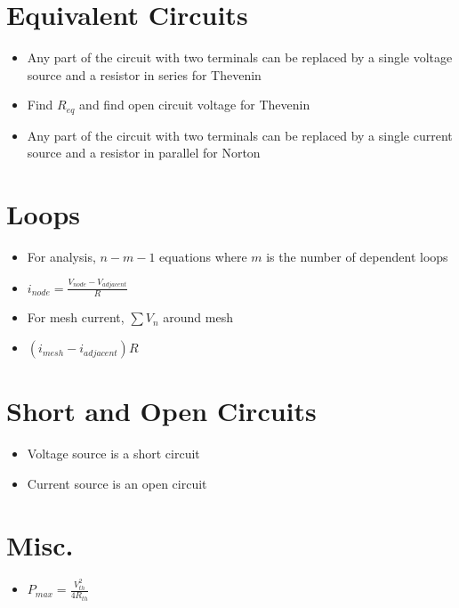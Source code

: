 \documentclass [12pt] {article}
\begin{document}
\begin{multicols*}{2}
\section{Equivalent Circuits}
	\begin{itemize}
		\item Any part of the circuit with two terminals can be replaced by a single voltage source and a resistor in series for Thevenin 
		\item Find $R_{eq}$ and find open circuit voltage for Thevenin
		\item Any part of the circuit with two terminals can be replaced by a single current source and a resistor in parallel for Norton 
	\end{itemize}
\section{Loops}
	\begin{itemize}
		\item For analysis, $n - m - 1$ equations where $m$ is the number of dependent loops
		\item $i_{node} = \frac{V_{node} - V_{adjacent}}{R}$
		\item For mesh current, $\sum V_n$ around mesh
		\item $(i_{mesh} - i_{adjacent})R$
	\end{itemize}
\section{Short and Open Circuits}
	\begin{itemize}
		\item Voltage source is a short circuit
		\item Current source is an open circuit
	\end{itemize}
\section{Misc.}
	\begin{itemize}
		\item $P_{max} = \frac{V_{th}^2}{4R_{th}}$
	\end{itemize}
\end{multicols*}
\newpage
\end{document}

